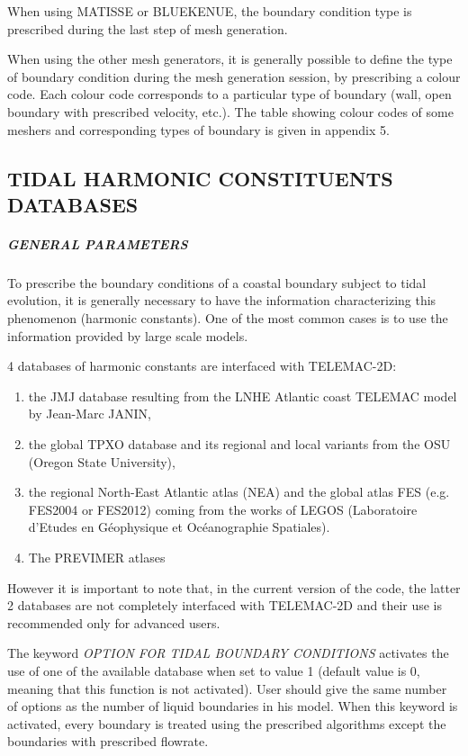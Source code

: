  When using MATISSE or BLUEKENUE, the boundary condition type is prescribed during the last step of mesh generation.

 When using the other mesh generators, it is generally possible to define the type of boundary condition during the mesh generation session, by prescribing a colour code. Each colour code corresponds to a particular type of boundary (wall, open boundary with prescribed velocity, etc.). The table showing colour codes of some meshers and corresponding types of boundary is given in appendix 5.


\subsection{ TIDAL HARMONIC CONSTITUENTS DATABASES}


\subparagraph{ GENERAL PARAMETERS}

 To prescribe the boundary conditions of a coastal boundary subject to tidal evolution, it is generally necessary to have the information characterizing this phenomenon (harmonic constants). One of the most common cases is to use the information provided by large scale models.

 4 databases of harmonic constants are interfaced with TELEMAC-2D:

\begin{enumerate}
\item  the JMJ database resulting from the LNHE Atlantic coast TELEMAC model by Jean-Marc JANIN,

\item  the global TPXO database and its regional and local variants from the OSU (Oregon State University),

\item  the regional North-East Atlantic atlas (NEA) and the global atlas FES (e.g. FES2004 or FES2012) coming from the works of LEGOS (Laboratoire d'Etudes en G\'{e}ophysique et Oc\'{e}anographie Spatiales).

\item  The PREVIMER atlases
\end{enumerate}

 However it is important to note that, in the current version of the code, the latter 2 databases are not completely interfaced with TELEMAC-2D and their use is recommended only for advanced users.

 The keyword \textit{OPTION FOR TIDAL BOUNDARY CONDITIONS} activates the use of one of the available database when set to value 1 (default value is 0, meaning that this function is not activated). User should give the same number of options as the number of liquid boundaries in his model. When this keyword is activated, every boundary is treated using the prescribed algorithms except the boundaries with prescribed flowrate.


